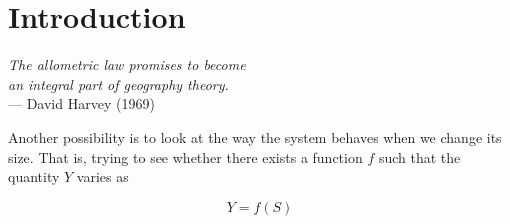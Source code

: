 \chapter{Introduction}
\label{sec:scaling_introduction}

\begin{flushright}{\slshape    
The allometric law promises to become\\
an integral part of geography theory.} \\ \medskip
--- David Harvey (1969)~\cite{Harvey:1969} 
\end{flushright}


Another possibility is to look at the way
the system behaves when we change its size. That is, trying to see whether there
exists a function $f$ such that the quantity $Y$ varies as

\begin{equation}
    Y = f(S)
\end{equation}

